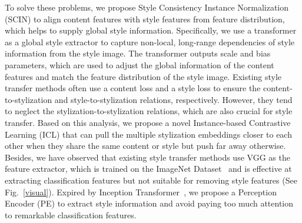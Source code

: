 \documentclass[times,twocolumn,final,authoryear]{elsarticle}
\begin{document}
To solve these problems, we propose Style Consistency Instance Normalization (SCIN) to align content features with style features from feature distribution, which helps to supply global style information.
Specifically, we use a transformer~\citep{vaswani2017attention,lyu2023multicontrast,lyu2023region,li2022wavtrans,li2022transformer} as a global style extractor to capture non-local, long-range dependencies of style information from the style image. The transformer outputs scale and bias parameters, which are used to adjust the global information of the content features and match the feature distribution of the style image. Existing style transfer methods often use a content loss and a style loss to ensure the content-to-stylization and style-to-stylization relations, respectively. However, they tend to neglect the stylization-to-stylization relations, which are also crucial for style transfer. Based on this analysis, we propose a novel Instance-based Contrastive Learning (ICL) that can pull the multiple
stylization embeddings closer to each other when they share the same content or style but push far
away otherwise. Besides, we have observed that existing style transfer methods use VGG as the feature extractor, which is trained on the ImageNet Dataset~\citep{deng2009imagenet} and is effective at extracting classification features but not suitable for removing style features (See Fig.~\ref{visual}). Expired by Inception Transformer~\citep{siinception}, we propose a Perception Encoder (PE) to extract style information and avoid paying too much attention to remarkable classification features. 

\end{document}
